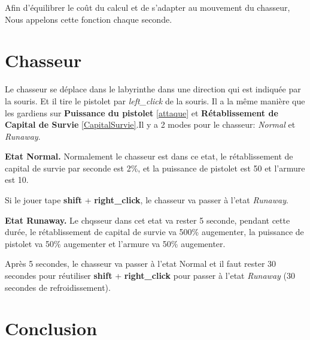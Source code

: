 \documentclass{article}
\begin{document}
Afin d'équilibrer le coût du calcul et de s'adapter au mouvement du chasseur, Nous appelons cette fonction chaque seconde.

\section{Chasseur}
Le chasseur se déplace dans le labyrinthe dans une direction qui est indiquée par la souris. Et il tire le pistolet par \textsl{left\_click} de la souris. Il a la même manière que les gardiens sur \textbf{Puissance du pistolet} \ref{attaque} et \textbf{Rétablissement de Capital de Survie} \ref{CapitalSurvie}.Il y a 2 modes pour le chasseur: \textsl{Normal} et \textsl{Runaway}.

\textbf{Etat Normal.} Normalement le chasseur est dans ce etat, le  rétablissement de capital de survie par seconde est 2\%, et la puissance de pistolet est 50 et l'armure est 10. 

Si le jouer tape \textbf{shift} + \textbf{right\_click}, le chasseur va passer à l'etat   \textsl{Runaway}.

\textbf{Etat Runaway.} Le chqsseur dans cet etat va rester 5 seconde, pendant cette durée,  le  rétablissement de capital de survie va 500\% augementer, la puissance de pistolet va 50\% augementer et l'armure va 50\% augementer.

Après 5 secondes, le chasseur va passer à l'etat Normal et il faut rester 30 secondes pour réutiliser \textbf{shift} + \textbf{right\_click} pour passer à l'etat \textsl{Runaway} (30 secondes de refroidissement).


\section{Conclusion}


 
% 

\end{document}
